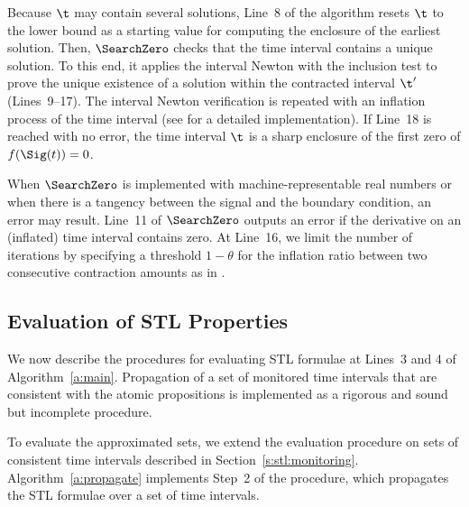 \documentclass[paper]{ieice}
\begin{document}
Because $\t$ may contain several solutions, 
Line~8 of the algorithm resets $\t$ to the lower bound as a starting value for computing the enclosure of the earliest solution.
Then, $\SearchZero$ checks that the time interval contains a unique solution.
To this end, it applies the interval Newton with the inclusion test to prove the unique existence of a solution within the contracted interval $\t'$ (Lines~9--17).
The interval Newton verification is repeated with an inflation process of the time interval (see \cite{Goldztejn2010:RC} for a detailed implementation).
If Line~18 is reached with no error, the time interval $\t$ is a sharp enclosure of the first zero of $f(\Sig(t))=0$. 


When $\SearchZero$ is implemented with machine-representable real numbers or when there is a tangency between the signal and the boundary condition, an error may result.
Line~11 of $\SearchZero$ outputs an error if the derivative on an (inflated) time interval contains zero.
At Line~16, we limit the number of iterations by specifying a threshold $1\!-\!\theta$ for the inflation ratio between two consecutive contraction amounts as in \cite{Goldztejn2010:RC}.




\subsection{Evaluation of STL Properties}
\label{s:method:propag}

We now describe the procedures for evaluating STL formulae at Lines~3 and 4 of Algorithm~\ref{a:main}.
Propagation of a set of monitored time intervals that are consistent with the atomic propositions is implemented as a rigorous and sound but incomplete procedure.

To evaluate the approximated sets, we extend the evaluation procedure on sets of consistent time intervals described in Section~\ref{s:stl:monitoring}.
Algorithm~\ref{a:propagate} implements Step~2 of the procedure, which propagates the STL formulae over a set of time intervals.
\end{document}
